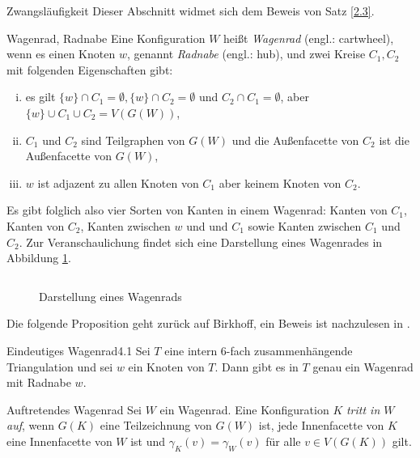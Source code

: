 \begin{section}{Zwangsläufigkeit}
  Dieser Abschnitt widmet sich dem Beweis von Satz \ref{2.3}.
 
 \begin{definition}{Wagenrad, Radnabe}
  Eine Konfiguration $W$ heißt \textit{Wagenrad} (engl.: cartwheel), wenn es einen Knoten $w$, genannt \textit{Radnabe} (engl.: hub), und zwei Kreise $C_1, C_2$ mit folgenden Eigenschaften gibt:
  \begin{enumerate}[(i)]
   \item es gilt $\{w\} \cap C_1 = \emptyset,\{w\} \cap C_2 = \emptyset$ und $C_2 \cap C_1 = \emptyset$, aber $\{w\} \cup C_1 \cup C_2 = V(G(W))$,
   \item $C_1$ und $C_2$ sind Teilgraphen von $G(W)$ und die Außenfacette von $C_2$ ist die Außenfacette von $G(W)$,
   \item $w$ ist adjazent zu allen Knoten von $C_1$ aber keinem Knoten von $C_2$.
  \end{enumerate}
 \end{definition}

 Es gibt folglich also vier Sorten von Kanten in einem Wagenrad: Kanten von $C_1$, Kanten von $C_2$, Kanten zwischen $w$ und und $C_1$ sowie Kanten zwischen $C_1$ und $C_2$. Zur Veranschaulichung findet sich eine Darstellung eines Wagenrades in Abbildung \ref{fig3}.
 
 \begin{figure}[ht]
  \label{fig3}
  \[  \]
  \caption[Darstellung eines Wagenrads]{Darstellung eines Wagenrads}
 \end{figure}

 Die folgende Proposition geht zurück auf Birkhoff, ein Beweis ist nachzulesen in \cite{AmJMath35}.
 
 \begin{propositionl}{Eindeutiges Wagenrad}{4.1}
  Sei $T$ eine intern 6-fach zusammenhängende Triangulation und sei $w$ ein Knoten von $T$. Dann gibt es in $T$ genau ein Wagenrad mit Radnabe $w$.
 \end{propositionl}
 
 \begin{definition}{Auftretendes Wagenrad}
  Sei $W$ ein Wagenrad. Eine Konfiguration $K$ \textit{tritt in $W$ auf}, wenn $G(K)$ eine Teilzeichnung von $G(W)$ ist, jede Innenfacette von $K$ eine Innenfacette von $W$ ist und $\gamma_K(v) = \gamma_W(v)$ für alle $v\in V(G(K))$ gilt. 
 \end{definition}
 

\end{section}
